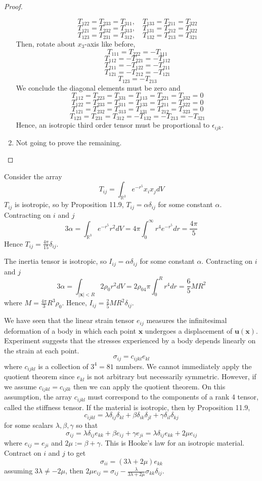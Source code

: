 \documentclass[a4paper]{article}
\begin{document}
\begin{proof}
\begin{enumerate}
    $$T_{122}=T_{233}=T_{311},\quad T_{133}=T_{211}=T_{322}$$
    $$T_{121}=T_{232}=T_{313},\quad T_{131}=T_{212}=T_{322}$$
    $$T_{123}=T_{231}=T_{312},\quad T_{132}=T_{213}=T_{321}$$
    Then, rotate about $x_3$-axis like before,
    $$T_{111}=T_{222}=-T_{111}$$
    $$T_{112}=-T_{221}=-T_{112}$$
    $$T_{211}=-T_{122}=-T_{211}$$
    $$T_{121}=-T_{212}=-T_{121}$$
    $$T_{123}=-T_{213}$$
    We conclude the diagonal elements must be zero and
    $$T_{112}=T_{223}=T_{331}=T_{113}=T_{221}=T_{332}=0$$
    $$T_{122}=T_{233}=T_{311}=T_{133}=T_{211}=T_{322}=0$$
    $$T_{121}=T_{232}=T_{313}=T_{131}=T_{212}=T_{323}=0$$
    $$T_{123}=T_{231}=T_{312}=-T_{132}=-T_{213}=-T_{321}$$
    Hence, an isotropic third order tensor must be proportional to $\epsilon_{ijk}$.
    \item Not going to prove the remaining.
\end{enumerate}
\end{proof}
\begin{eg}
Consider the array
$$T_{ij}=\int_{\mathbb{R}^3}e^{-r^5}x_ix_jdV$$
$T_{ij}$ is isotropic, so by Proposition 11.9, $T_{ij}=\alpha\delta_{ij}$ for some constant $\alpha$. Contracting on $i$ and $j$
$$3\alpha=\int_{\mathbb{R}^3}e^{-r^5}r^2dV=4\pi\int_0^\infty r^4e^{-r^5}dr=\frac{4\pi}{5}$$
Hence $T_{ij}=\frac{4\pi}{15}\delta_{ij}$.
\end{eg}
\begin{eg}
The inertia tensor is isotropic, so $I_{ij}=\alpha\delta_{ij}$ for some constant $\alpha$. Contracting on $i$ and $j$
$$3\alpha=\int_{|\mathbf{x}|<R}2\rho_0r^2dV=2\rho_04\pi\int_0^Rr^4dr=\frac{6}{5}MR^2$$
where $M=\frac{4\pi}{3}R^3\rho_0$. Hence, $I_{ij}=\frac{2}{5}MR^2\delta_{ij}$.
\end{eg}
\begin{eg}
We have seen that the linear strain tensor $e_{ij}$ measures the infinitesimal deformation of a body in which each point $\mathbf{x}$ undergoes a displacement of $\mathbf{u}(\mathbf{x})$. Experiment suggests that the stresses experienced by a body depends linearly on the strain at each point. $$\sigma_{ij}=c_{ijkl}e_{kl}$$
where $c_{ijkl}$ is a collection of $3^4=81$ numbers. We cannot immediately apply the quotient theorem since $e_{kl}$ is not arbitrary but necessarily symmetric. However, if we assume $c_{ijkl}=c_{ijlk}$ then we can apply the quotient theorem. On this assumption, the array $c_{ijkl}$ must correspond to the components of a rank 4 tensor, called the stiffness tensor. If the material is isotropic, then by Proposition 11.9,
$$c_{ijkl}=\lambda\delta_{ij}\delta_{kl}+\beta\delta_{ik}\delta_{jl}+\gamma\delta_{il}\delta_{kj}$$
for some scalars $\lambda,\beta,\gamma$ so that
$$\sigma_{ij}=\lambda\delta_{ij}e_{kk}+\beta e_{ij}+\gamma e_{ji}=\lambda\delta_{ij}e_{kk}+2\mu e_{ij}$$
where $e_{ij}=e_{ji}$ and $2\mu:=\beta+\gamma$. This is Hooke's law for an isotropic material. Contract on $i$ and $j$ to get
$$\sigma_{ii}=(3\lambda+2\mu)e_{kk}$$
assuming $3\lambda\neq -2\mu$, then $2\mu e_{ij}=\sigma_{ij}-\frac{\lambda}{3\lambda+2\mu}\sigma_{kk}\delta_{ij}$.
\end{eg}
\newpage
\end{document}
